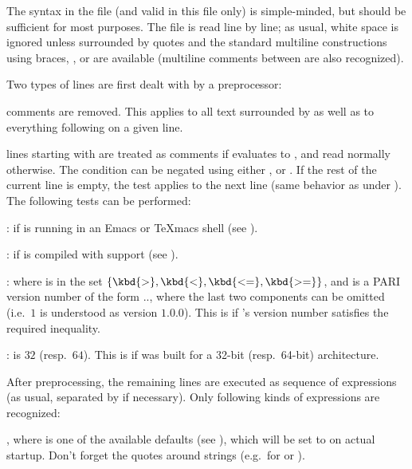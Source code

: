  The syntax in the  file (and valid in this file
only) is simple-minded, but should be sufficient for most purposes. The file
is read line by line; as usual, white space is ignored unless surrounded by
quotes and the standard multiline constructions using braces, \kbd{\bs}, or
\kbd{=} are available (multiline comments between \kbd{/*~\dots~*/} are also
recognized).

Two types of lines are first dealt with by a preprocessor:

\item comments are removed. This applies to all text surrounded by
\kbd{/*~\dots~*/} as well as to everything following \kbd{\bs\bs} on a given
line.

\item lines starting with   are treated as
comments if  evaluates to , and read normally
otherwise. The condition can be negated using either ,
 or . If the rest of the current line is empty, the
test applies to the next line (same behavior as \kbd{=} under ). The
following tests can be performed:

:  if  is running in an Emacs or TeXmacs shell (see
).

:  if  is compiled with  support (see
).

  : where  is in the set
$\{ \kbd{>}, \kbd{<}, \kbd{<=}, \kbd{>=} \}$, and  is a PARI
version number of the form .., where the
last two components can be omitted (i.e.~$1$ is understood as version $1.0.0$).
This is  if 's version number satisfies the required
inequality.

 \kbd{==} :  is $32$ (resp.~$64$).
This is  if  was built for a 32-bit (resp.~64-bit)
architecture.

After preprocessing, the remaining lines are executed as
sequence of expressions (as usual, separated by \kbd{;} if necessary). Only
following kinds of expressions are recognized:

\item {} \kbd{=} , where  is one of
the available defaults (see ), which will be set to
 on actual startup. Don't forget the quotes around strings
(e.g.~for  or ).

